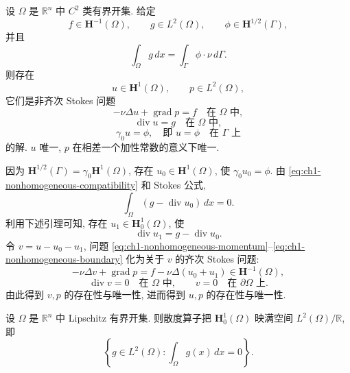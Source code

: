 \begin{Theorem}
\label{thm:ch1-nonhomogeneous-stokes}
设 $\Omega$ 是 $\mathbb R^n$ 中 $C^2$ 类有界开集. 给定
\[
f\in\mathbf H^{-1}(\Omega),\qquad g\in L^2(\Omega),\qquad
\phi\in\mathbf H^{1/2}(\Gamma),
\]
并且
\begin{equation}
\int_\Omega g\,dx=\int_\Gamma\phi\cdot\nu\,d\Gamma.
\label{eq:ch1-nonhomogeneous-compatibility}
\end{equation}
则存在
\[
u\in\mathbf H^1(\Omega),\qquad p\in L^2(\Omega),
\]
它们是非齐次 Stokes 问题
\begin{equation}
-\nu\Delta u+\operatorname{grad}p=f\quad\text{在 }\Omega\text{ 中},
\label{eq:ch1-nonhomogeneous-momentum}
\end{equation}
\begin{equation}
\operatorname{div}u=g\quad\text{在 }\Omega\text{ 中},
\label{eq:ch1-nonhomogeneous-divergence}
\end{equation}
\begin{equation}
\gamma_0u=\phi,\quad\text{即 }u=\phi\quad\text{在 }\Gamma\text{ 上}
\label{eq:ch1-nonhomogeneous-boundary}
\end{equation}
的解. $u$ 唯一, $p$ 在相差一个加性常数的意义下唯一.
\end{Theorem}

\begin{Proof}
因为 $\mathbf H^{1/2}(\Gamma)=\gamma_0\mathbf H^1(\Omega)$, 存在 $u_0\in\mathbf H^1(\Omega)$, 使 $\gamma_0u_0=\phi$. 由 \eqref{eq:ch1-nonhomogeneous-compatibility} 和 Stokes 公式,
\[
\int_\Omega(g-\operatorname{div}u_0)\,dx=0.
\]
利用下述引理可知, 存在 $u_1\in\mathbf H_0^1(\Omega)$, 使
\[
\operatorname{div}u_1=g-\operatorname{div}u_0.
\]
令 $v=u-u_0-u_1$, 问题 \eqref{eq:ch1-nonhomogeneous-momentum}--\eqref{eq:ch1-nonhomogeneous-boundary} 化为关于 $v$ 的齐次 Stokes 问题:
\[
-\nu\Delta v+\operatorname{grad}p
=f-\nu\Delta(u_0+u_1)\in\mathbf H^{-1}(\Omega),
\]
\[
\operatorname{div}v=0\quad\text{在 }\Omega\text{ 中},
\qquad
v=0\quad\text{在 }\partial\Omega\text{ 上}.
\]
由此得到 $v,p$ 的存在性与唯一性, 进而得到 $u,p$ 的存在性与唯一性.
\end{Proof}

\begin{Lemma}
\label{lem:ch1-divergence-surjective}
设 $\Omega$ 是 $\mathbb R^n$ 中 Lipschitz 有界开集. 则散度算子把 $\mathbf H_0^1(\Omega)$ 映满空间 $L^2(\Omega)/\mathbb R$, 即
\begin{equation}
\left\{g\in L^2(\Omega):\int_\Omega g(x)\,dx=0\right\}.
\label{eq:ch1-zero-mean-l2-space}
\end{equation}
\end{Lemma}


